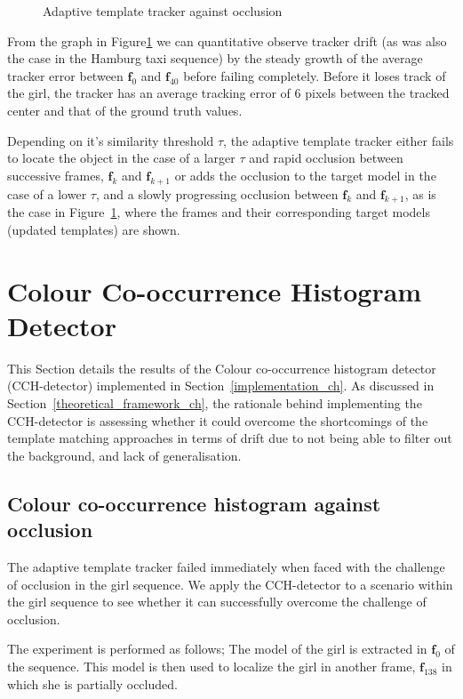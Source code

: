 \begin{figure}
{\begin{tabular}{cccc}
        \end{tabular}}
    \caption{Adaptive template tracker against occlusion\label{fig:adaptive_template_occlusion}}
\end{figure}

From the graph in Figure\ref{fig:adaptive_template_occlusion} we can
quantitative observe tracker drift (as was also the case in the Hamburg taxi
sequence) by the steady growth of the average tracker error between
$\mathbf{f}_0$ and $\mathbf{f}_{40}$ before failing completely.
Before it loses track of the girl, the tracker has an average tracking error of
6 pixels between the tracked center and that of the ground truth values.

Depending on it's similarity threshold $\tau$, the adaptive template tracker
either fails to locate the object in the case of a larger $\tau$ and rapid
occlusion between successive frames, $\mathbf{f}_k$ and $\mathbf{f}_{k+1}$ or
adds the occlusion to the target model in the case of a lower $\tau$, and a
slowly progressing occlusion between $\mathbf{f}_k$ and $\mathbf{f}_{k+1}$, as
is the case in Figure~\ref{fig:adaptive_template_occlusion}, where the frames
and their corresponding target models (updated templates) are shown. 


\section{Colour Co-occurrence Histogram Detector}
This Section details the results of the Colour co-occurrence histogram detector
(CCH-detector) implemented in Section~\ref{implementation_ch}.
As discussed in Section~\ref{theoretical_framework_ch}, the rationale behind
implementing the CCH-detector is assessing whether it could overcome the
shortcomings of the template matching approaches in terms of drift due to not
being able to filter out the background, and lack of generalisation.

\subsection{Colour co-occurrence histogram against occlusion}
The adaptive template tracker failed immediately when faced with the challenge
of occlusion in the girl sequence. We apply the CCH-detector to a scenario within
the girl sequence to see whether it can successfully overcome the challenge of
occlusion.

The experiment is performed as follows; The model of the girl is extracted in
$\mathbf{f}_0$ of the sequence. This model is then used to localize
the girl in another frame, $\mathbf{f}_{138}$ in which she is partially
occluded.

